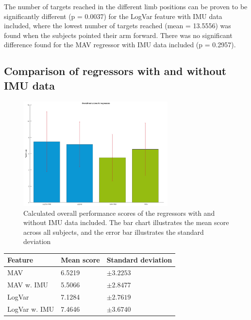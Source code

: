 The number of targets reached in the different limb positions can be proven to be significantly different (p = 0.0037) for the LogVar feature with IMU data included, where the lowest number of targets reached (mean = 13.5556) was found when the subjects pointed their arm forward. There was no significant difference found for the MAV regressor with IMU data included (p = 0.2957).
	
\subsection{Comparison of regressors with and without IMU data}

\begin{figure}[H]
	\includegraphics[width=0.7\textwidth]{figures/results/allRegressorBarzTimeScoreForTargetTest}  %
	\caption{Calculated overall performance scores of the regressors with and without IMU data included. The bar chart illustrates the mean score across all subjects, and the error bar illustrates the standard deviation}
	\label{fig:gotItTimeOverall}  %
\end{figure}

\begin{center}
	\begin{tabular}{l l l}
		\toprule
		\textbf{Feature} & \textbf{Mean score} & \textbf{Standard deviation}\\
		\midrule
		MAV & 6.5219 & $\pm 3.2253$ \\
		MAV w. IMU & 5.5066 & $\pm 2.8477$ \\
		LogVar & 7.1284 & $\pm 2.7619$ \\
		LogVar w. IMU & 7.4646 & $\pm 3.6740$ \\
		\bottomrule
	\end{tabular}
\end{center}


